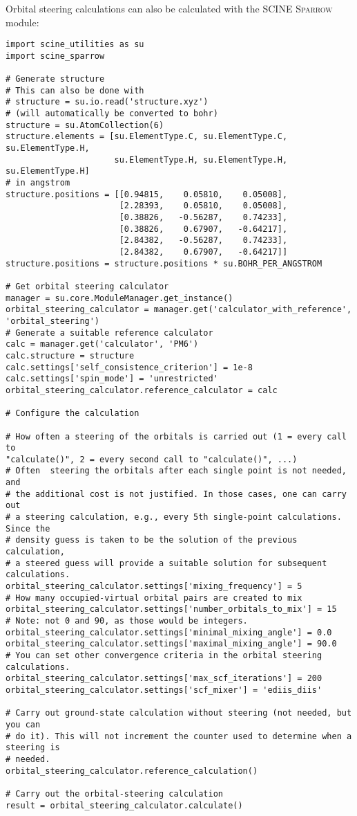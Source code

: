 \documentclass[]{tufte-book}
\begin{document}
Orbital steering calculations can also be calculated with the SCINE \textsc{Sparrow} module:
\begin{verbatim}
import scine_utilities as su
import scine_sparrow

# Generate structure
# This can also be done with 
# structure = su.io.read('structure.xyz')
# (will automatically be converted to bohr)
structure = su.AtomCollection(6)
structure.elements = [su.ElementType.C, su.ElementType.C, su.ElementType.H, 
                      su.ElementType.H, su.ElementType.H, su.ElementType.H]
# in angstrom                                                                
structure.positions = [[0.94815,    0.05810,    0.05008], 
                       [2.28393,    0.05810,    0.05008],       
                       [0.38826,   -0.56287,    0.74233],       
                       [0.38826,    0.67907,   -0.64217],       
                       [2.84382,   -0.56287,    0.74233],       
                       [2.84382,    0.67907,   -0.64217]]
structure.positions = structure.positions * su.BOHR_PER_ANGSTROM

# Get orbital steering calculator
manager = su.core.ModuleManager.get_instance()
orbital_steering_calculator = manager.get('calculator_with_reference',
'orbital_steering')
# Generate a suitable reference calculator
calc = manager.get('calculator', 'PM6')
calc.structure = structure
calc.settings['self_consistence_criterion'] = 1e-8
calc.settings['spin_mode'] = 'unrestricted'
orbital_steering_calculator.reference_calculator = calc

# Configure the calculation

# How often a steering of the orbitals is carried out (1 = every call to
"calculate()", 2 = every second call to "calculate()", ...)
# Often  steering the orbitals after each single point is not needed, and
# the additional cost is not justified. In those cases, one can carry out
# a steering calculation, e.g., every 5th single-point calculations. Since the
# density guess is taken to be the solution of the previous calculation, 
# a steered guess will provide a suitable solution for subsequent calculations.
orbital_steering_calculator.settings['mixing_frequency'] = 5
# How many occupied-virtual orbital pairs are created to mix
orbital_steering_calculator.settings['number_orbitals_to_mix'] = 15
# Note: not 0 and 90, as those would be integers.
orbital_steering_calculator.settings['minimal_mixing_angle'] = 0.0
orbital_steering_calculator.settings['maximal_mixing_angle'] = 90.0
# You can set other convergence criteria in the orbital steering calculations.
orbital_steering_calculator.settings['max_scf_iterations'] = 200 
orbital_steering_calculator.settings['scf_mixer'] = 'ediis_diis'

# Carry out ground-state calculation without steering (not needed, but you can
# do it). This will not increment the counter used to determine when a steering is
# needed.
orbital_steering_calculator.reference_calculation()

# Carry out the orbital-steering calculation
result = orbital_steering_calculator.calculate()

\end{verbatim}
\end{document}
